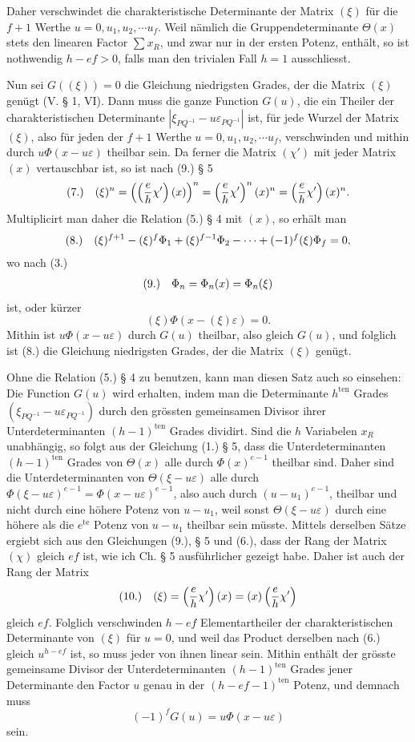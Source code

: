 \documentclass[11pt]{article}
\makeatletter
\newcommand{\frobtag}[2]{\[\begin{array}{@{}r@{\quad}l@{}}\textup{(#1)} & \displaystyle #2\end{array}\]}
\newcommand{\frobtagc}[2]{\[\begin{array}{@{}r@{\quad}c@{}}\textup{(#1)} & \displaystyle #2\end{array}\]}
\makeatother
\begin{document}
Daher verschwindet die charakteristische Determinante der Matrix $(\xi)$ für die $f+1$ Werthe $u=0,u_1,u_2,\cdots u_f$. Weil nämlich die Gruppendeterminante $\Theta(x)$ stets den linearen Factor $\sum x_R$, und zwar nur in der ersten Potenz, enthält, so ist nothwendig $h-ef>0$, falls man den trivialen Fall $h=1$ ausschliesst.

Nun sei $G((\xi))=0$ die Gleichung niedrigsten Grades, der die Matrix $(\xi)$ genügt (V. § 1, VI). Dann muss die ganze Function $G(u)$, die ein Theiler der charakteristischen Determinante $\left|\xi_{PQ^{-1}}-u\varepsilon_{PQ^{-1}}\right|$ ist, für jede Wurzel der Matrix $(\xi)$, also für jeden der $f+1$ Werthe $u=0,u_1,u_2,\cdots u_f$, verschwinden und mithin durch $u\Phi(x-u\varepsilon)$ theilbar sein. Da ferner die Matrix $(\chi')$ mit jeder Matrix $(x)$ vertauschbar ist, so ist nach (9.) § 5
\frobtag{7.}{(\xi)^n=\left(\left(\frac{e}{h}\chi'\right)(x)\right)^n=\left(\frac{e}{h}\chi'\right)^n(x)^n=\left(\frac{e}{h}\chi'\right)(x)^n.}
Multiplicirt man daher die Relation (5.) § 4 mit $(x)$, so erhält man
\frobtag{8.}{(\xi)^{f+1}-(\xi)^f\Phi_1+(\xi)^{f-1}\Phi_2-\cdots+(-1)^f(\xi)\Phi_f=0,}
wo nach (3.)
\frobtagc{9.}{\Phi_n=\Phi_n(x)=\Phi_n(\xi)}
ist, oder kürzer
\[
(\xi)\Phi(x-(\xi)\varepsilon)=0.
\]
Mithin ist $u\Phi(x-u\varepsilon)$ durch $G(u)$ theilbar, also gleich $G(u)$, und folglich ist (8.) die Gleichung niedrigsten Grades, der die Matrix $(\xi)$ genügt.

Ohne die Relation (5.) § 4 zu benutzen, kann man diesen Satz auch so einsehen: Die Function $G(u)$ wird erhalten, indem man die Determinante $h^{\mathrm{ten}}$ Grades $(\xi_{PQ^{-1}}-u\varepsilon_{PQ^{-1}})$ durch den grössten gemeinsamen Divisor ihrer Unterdeterminanten $(h-1)^{\mathrm{ten}}$ Grades dividirt. Sind die $h$ Variabelen $x_R$ unabhängig, so folgt aus der Gleichung (1.) § 5, dass die Unterdeterminanten $(h-1)^{\mathrm{ten}}$ Grades von $\Theta(x)$ alle durch $\Phi(x)^{e-1}$ theilbar sind. Daher sind die Unterdeterminanten von $\Theta(\xi-u\varepsilon)$ alle durch $\Phi(\xi-u\varepsilon)^{e-1}=\Phi(x-u\varepsilon)^{e-1}$, also auch durch $(u-u_1)^{e-1}$, theilbar und nicht durch eine höhere Potenz von $u-u_1$, weil sonst $\Theta(\xi-u\varepsilon)$ durch eine höhere als die $e^{\mathrm{te}}$ Potenz von $u-u_1$ theilbar sein müsste. Mittels derselben Sätze ergiebt sich aus den Gleichungen (9.), § 5 und (6.), dass der Rang der Matrix $(\chi)$ gleich $ef$ ist, wie ich Ch. § 5 ausführlicher gezeigt habe. Daher ist auch der Rang der Matrix
\frobtagc{10.}{(\xi)=\left(\frac{e}{h}\chi'\right)(x)=(x)\left(\frac{e}{h}\chi'\right)}
gleich $ef$. Folglich verschwinden $h-ef$ Elementartheiler der charakteristischen Determinante von $(\xi)$ für $u=0$, und weil das Product derselben nach (6.) gleich $u^{h-ef}$ ist, so muss jeder von ihnen linear sein. Mithin enthält der grösste gemeinsame Divisor der Unterdeterminanten $(h-1)^{\mathrm{ten}}$ Grades jener Determinante den Factor $u$ genau in der $(h-ef-1)^{\mathrm{ten}}$ Potenz, und demnach muss
\[
(-1)^fG(u)=u\Phi(x-u\varepsilon)
\]
sein.
\end{document}
